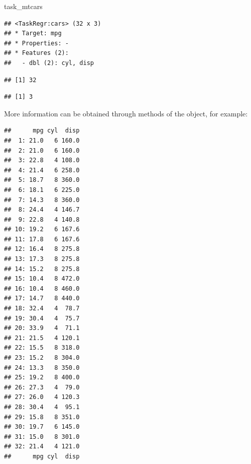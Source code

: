 \documentclass[
]{scrbook}
\newenvironment{Shaded}{\begin{snugshade}}{\end{snugshade}}
\newcommand{\FunctionTok}[1]{\textcolor[rgb]{0.00,0.00,0.00}{#1}}
\newcommand{\NormalTok}[1]{#1}
\newcommand{\SpecialCharTok}[1]{\textcolor[rgb]{0.00,0.00,0.00}{#1}}
\renewenvironment{Shaded} {\begin{snugshade}\small} {\end{snugshade}}
\begin{document}
\begin{Shaded}
\begin{Highlighting}[]
\NormalTok{task\_mtcars}
\end{Highlighting}
\end{Shaded}

\begin{verbatim}
## <TaskRegr:cars> (32 x 3)
## * Target: mpg
## * Properties: -
## * Features (2):
##   - dbl (2): cyl, disp
\end{verbatim}

\begin{Shaded}
\end{Shaded}

\begin{verbatim}
## [1] 32
\end{verbatim}

\begin{Shaded}
\end{Shaded}

\begin{verbatim}
## [1] 3
\end{verbatim}

More information can be obtained through methods of the object, for example:

\begin{Shaded}
\end{Shaded}

\begin{verbatim}
##      mpg cyl  disp
##  1: 21.0   6 160.0
##  2: 21.0   6 160.0
##  3: 22.8   4 108.0
##  4: 21.4   6 258.0
##  5: 18.7   8 360.0
##  6: 18.1   6 225.0
##  7: 14.3   8 360.0
##  8: 24.4   4 146.7
##  9: 22.8   4 140.8
## 10: 19.2   6 167.6
## 11: 17.8   6 167.6
## 12: 16.4   8 275.8
## 13: 17.3   8 275.8
## 14: 15.2   8 275.8
## 15: 10.4   8 472.0
## 16: 10.4   8 460.0
## 17: 14.7   8 440.0
## 18: 32.4   4  78.7
## 19: 30.4   4  75.7
## 20: 33.9   4  71.1
## 21: 21.5   4 120.1
## 22: 15.5   8 318.0
## 23: 15.2   8 304.0
## 24: 13.3   8 350.0
## 25: 19.2   8 400.0
## 26: 27.3   4  79.0
## 27: 26.0   4 120.3
## 28: 30.4   4  95.1
## 29: 15.8   8 351.0
## 30: 19.7   6 145.0
## 31: 15.0   8 301.0
## 32: 21.4   4 121.0
##      mpg cyl  disp
\end{verbatim}
\end{document}
